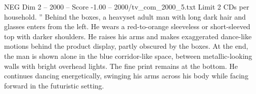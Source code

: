 \begin{textsample}{NEG Dim 2 – 2000 – Score -1.00 – 2000/tv\_com\_2000\_5.txt}
Limit 2 CDs per household. ” Behind the boxes, a heavyset adult man with long dark hair and glasses enters from the left.
He wears a red-to-orange sleeveless or short-sleeved top with darker shoulders.
He raises his arms and makes exaggerated dance-like motions behind the product display, partly obscured by the boxes.
At the end, the man is shown alone in the blue corridor-like space, between metallic-looking walls with bright overhead lights.
The fine print remains at the bottom.
He continues dancing energetically, swinging his arms across his body while facing forward in the futuristic setting.

\end{textsample}
